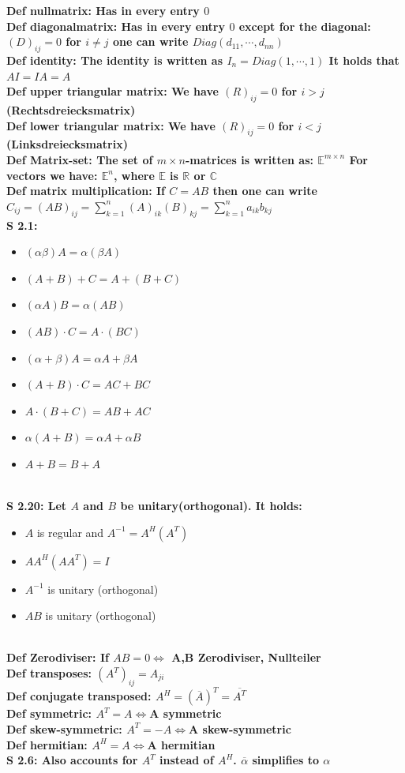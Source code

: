 \documentclass[7pt,landscape, margin = 0.1mm]{article}
\newcommand{\DEF}[2]{\color{chaptercolor}\bf{Def #1}:\color{black}    \hspace{0.2cm} #2 \\}
\newcommand{\SA}[2]{\color{chaptercolor}\bf{S #1}:\color{black}    \hspace{0.2cm} #2 \\}
\begin{document}
\begin{multicols}{4}
\begin{flushleft}
\DEF{nullmatrix}{Has in every entry $0$}
\DEF{diagonalmatrix}{Has in every entry $0$ except for the diagonal: $(D)_{ij} = 0$ for $i \neq j $ one can write $Diag(d_{11}, \cdots , d_{nn}) $}
\DEF{identity}{The identity is written as $I_n = Diag(1 , \cdots , 1)$ It holds that $AI = IA = A $}
\DEF{upper triangular matrix}{We have $(R)_{ij} = 0$ for $i > j $ (Rechtsdreiecksmatrix)}
\DEF{lower triangular matrix}{We have $(R)_{ij} = 0$ for $i < j $ (Linksdreiecksmatrix)}
\DEF{Matrix-set}{The set of $ m \times n $-matrices is written as: $\mathbb{E}^{m \times n } $ For vectors we have: $ \mathbb{E}^{n}$, where $ \mathbb{E}$ is $ \mathbb{R}$ or $ \mathbb{C}$ }
\DEF{matrix multiplication}{If $C =AB $ then one can write $C_{ij} = (AB)_{ij} = \sum_{k=1}^{n} (A)_{ik}(B)_{kj} = \sum_{k=1}^{n} a_{ik}b_{kj}   $}
\SA{2.1}{\begin{itemize}
\item $(\alpha \beta)A= \alpha (\beta A)$
 \item $(A+B)+C= A+(B+C)$
 \item  $(\alpha A)B= \alpha (AB)$ 
 \item $(AB)\cdot C = A \cdot(BC)$
 \item $(\alpha + \beta)A= \alpha A + \beta A $
 \item $(A+B)\cdot C = AC+BC $
 \item $ A\cdot (B+C) = AB+AC $
 \item $ \alpha (A+B)= \alpha A + \alpha B$
 \item $A+B=B+A$
 
\end{itemize}}
\SA{2.20}{Let $A $ and $B$ be unitary(orthogonal). It holds:
\begin{itemize}
\item $A$ is regular and $A^{-1}=A^H (A^T) $
\item $AA^H (AA^T) = I $
\item $A^{-1} $ is unitary (orthogonal)
\item  $AB $ is unitary (orthogonal)
\end{itemize}

}
\DEF{Zerodiviser}{If $AB=0  \Leftrightarrow $ A,B Zerodiviser, Nullteiler}
\DEF{transposes}{ $ (A^T)_{ij}=A_{ji} $}
\DEF{conjugate transposed}{$ A^H = (\overline{A})^T=\overline{A^{T}}$}
\DEF{symmetric}{$A^T = A  \Leftrightarrow $A symmetric}
\DEF{skew-symmetric}{$A^T = -A  \Leftrightarrow $A skew-symmetric}
\DEF{hermitian}{$A^H = A  \Leftrightarrow $A hermitian}
\SA{2.6}{  Also accounts for $A^T $ instead of $A^H$.
$ \overline{ \alpha} $ simplifies to $\alpha $ 



}
\end{flushleft}
\end{multicols}
\end{document}
